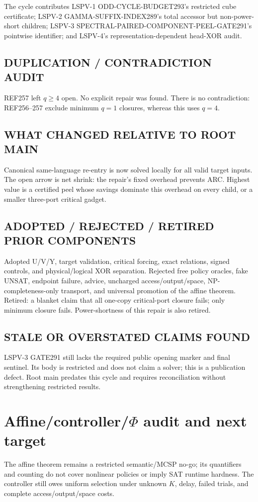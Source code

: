 \documentclass[11pt]{article}
\begin{document}
The cycle contributes LSPV-1 ODD-CYCLE-BUDGET293's restricted cube certificate; LSPV-2 GAMMA-SUFFIX-INDEX289's total accessor but non-power-short children; LSPV-3 SPECTRAL-PAIRED-COMPONENT-PEEL-GATE291's pointwise identifier; and LSPV-4's representation-dependent head-XOR audit.

\subsection*{DUPLICATION / CONTRADICTION AUDIT}
REF257 left $q\geq4$ open.  No explicit repair was found.  There is no contradiction: REF256--257 exclude minimum $q=1$ closures, whereas this uses $q=4$.

\subsection*{WHAT CHANGED RELATIVE TO ROOT MAIN}
Canonical same-language re-entry is now solved locally for all valid target inputs.  The open arrow is net shrink: the repair's fixed overhead prevents ARC.  Highest value is a certified peel whose savings dominate this overhead on every child, or a smaller three-port critical gadget.

\subsection*{ADOPTED / REJECTED / RETIRED PRIOR COMPONENTS}
Adopted U/V/Y, target validation, critical forcing, exact relations, signed controls, and physical/logical XOR separation.  Rejected free policy oracles, fake UNSAT, endpoint failure, advice, uncharged access/output/space, NP-completeness-only transport, and universal promotion of the affine theorem.  Retired: a blanket claim that all one-copy critical-port closure fails; only minimum closure fails.  Power-shortness of this repair is also retired.

\subsection*{STALE OR OVERSTATED CLAIMS FOUND}
LSPV-3 GATE291 still lacks the required public opening marker and final sentinel.  Its body is restricted and does not claim a solver; this is a publication defect.  Root main predates this cycle and requires reconciliation without strengthening restricted results.

\section{Affine/controller/$\Phi$ audit and next target}
The affine theorem remains a restricted semantic/MCSP no-go; its quantifiers and counting do not cover nonlinear policies or imply SAT runtime hardness.  The controller still owes uniform selection under unknown $K$, delay, failed trials, and complete access/output/space costs.
\end{document}

